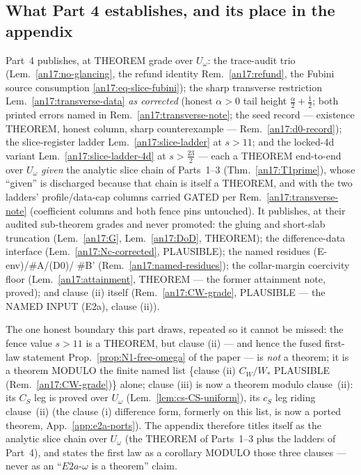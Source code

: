 \subsection{What Part 4 establishes, and its place in the
appendix}\label{an17:sec-p4-summary}

Part~4 publishes, at THEOREM grade over $U_\omega$: the trace-audit trio
(Lem.~\ref{an17:no-glancing}, the refund identity Rem.~\ref{an17:refund}, the
Fubini source consumption \eqref{an17:eq-slice-fubini}); the sharp transverse
restriction Lem.~\ref{an17:transverse-data} \emph{as corrected}
(honest $\alpha>0$ tail height $\tfrac\alpha2+\tfrac12$; both printed errors
named in Rem.~\ref{an17:transverse-note}; the seed record ---
existence THEOREM, honest column, sharp counterexample ---
Rem.~\ref{an17:d0-record}); the slice-register ladder
Lem.~\ref{an17:slice-ladder} at $s>11$; and the locked-4d variant
Lem.~\ref{an17:slice-ladder-4d} at $s>\tfrac{23}2$ --- each a THEOREM end-to-end
over $U_\omega$ \emph{given} the analytic slice chain of Parts~1--3
(Thm.~\ref{an17:T1prime}), whose ``given'' is discharged because that chain is
itself a THEOREM, and with the two ladders' profile/data-cap columns carried
GATED per Rem.~\ref{an17:transverse-note} (coefficient columns and both fence
pins untouched). It publishes, at their audited sub-theorem grades and never
promoted: the gluing and short-slab truncation (Lem.~\ref{an17:G},
Lem.~\ref{an17:DoD}, THEOREM); the difference-data interface
(Lem.~\ref{an17:Nc-corrected}, PLAUSIBLE); the named residues (E-env)/\#A/(D0)/%
\#B' (Rem.~\ref{an17:named-residues}); the collar-margin coercivity floor
(Lem.~\ref{an17:attainment}, THEOREM --- the former attainment note,
proved); and clause (ii) itself
(Rem.~\ref{an17:CW-grade}, PLAUSIBLE --- the NAMED INPUT (E2a), clause (ii)).

The one honest boundary this part draws, repeated so it cannot be missed: the
fence value $s>11$ is a THEOREM, but clause (ii) --- and hence the fused
first-law statement Prop.~\ref{prop:N1-free-omega} of the paper --- is
\emph{not} a theorem; it is a theorem MODULO the finite named list \{clause (ii)
$C_W/W_*$ PLAUSIBLE (Rem.~\ref{an17:CW-grade})\} alone; clause (iii) is now a
theorem modulo clause~(ii): its $C_S$ leg is proved over $U_\omega$
(Lem.~\ref{lem:cs-CS-uniform}), its $c_S$ leg riding clause~(ii) (the clause (i) difference form,
formerly on this list, is now a ported theorem, App.~\ref{app:e2a-ports}). The
appendix therefore titles itself as the analytic slice chain over $U_\omega$
(the THEOREM of Parts~1--3 plus the ladders of Part~4), and states the first law
as a corollary MODULO those three clauses --- never as an ``$E2a$-$\omega$ is a
theorem'' claim.

